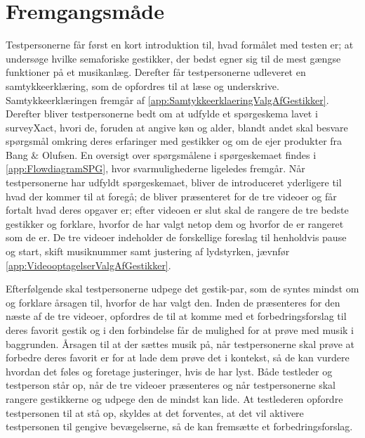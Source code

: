 \section{Fremgangsmåde}
\label{FremgangsmaadeValgAfGestikker}
%
Testpersonerne får først en kort introduktion til, hvad formålet med testen er; at undersøge hvilke semaforiske gestikker, der bedst egner sig til de mest gængse funktioner på et musikanlæg. Derefter får testpersonerne udleveret en samtykkeerklæring, som de opfordres til at læse og underskrive. Samtykkeerklæringen fremgår af \autoref{app:SamtykkeerklaeringValgAfGestikker}. Derefter bliver testpersonerne bedt om at udfylde et spørgeskema lavet i surveyXact, hvori de, foruden at angive køn og alder, blandt andet skal besvare spørgsmål omkring deres erfaringer med gestikker og om de ejer produkter fra Bang $\&$ Olufsen. En oversigt over spørgsmålene i spørgeskemaet findes i \autoref{app:FlowdiagramSPG}, hvor svarmulighederne ligeledes fremgår. Når testpersonerne har udfyldt spørgeskemaet, bliver de introduceret yderligere til hvad der kommer til at foregå; de bliver præsenteret for de tre videoer og får fortalt hvad deres opgaver er; efter videoen er slut skal de rangere de tre bedste gestikker og forklare, hvorfor de har valgt netop dem og hvorfor de er rangeret som de er. De tre videoer indeholder de forskellige foreslag til henholdvis pause og start, skift musiknummer samt justering af lydstyrken, jævnfør \autoref{app:VideooptagelserValgAfGestikker}. 

Efterfølgende skal testpersonerne udpege det gestik-par, som de syntes mindst om og forklare årsagen til, hvorfor de har valgt den. Inden de præsenteres for den næste af de tre videoer, opfordres de til at komme med et forbedringsforslag til deres favorit gestik og i den forbindelse får de mulighed for at prøve med musik i baggrunden. Årsagen til at der sættes musik på, når testpersonerne skal prøve at forbedre deres favorit er for at lade dem prøve det i kontekst, så de kan vurdere hvordan det føles og foretage justeringer, hvis de har lyst. Både testleder og testperson står op, når de tre videoer præsenteres og når testpersonerne skal rangere gestikkerne og udpege den de mindst kan lide. At testlederen opfordre testpersonen til at stå op, skyldes at det forventes, at det vil aktivere testpersonen til gengive bevægelserne, så de kan fremsætte et forbedringsforslag. 

